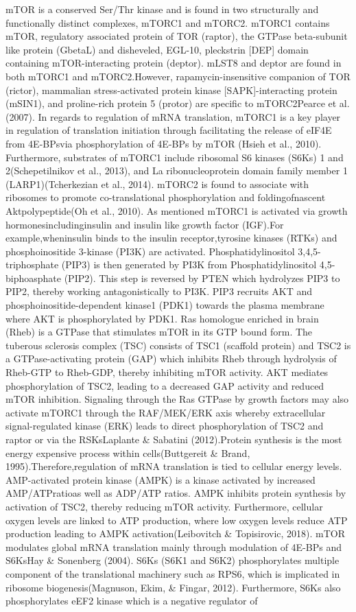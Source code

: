 \documentclass[
  12pt,
  openany]{book}
\begin{document}
mTOR is a conserved Ser/Thr kinase and is found in two structurally and functionally distinct complexes, mTORC1 and mTORC2. mTORC1 contains mTOR, regulatory associated protein of TOR (raptor), the GTPase beta-subunit like protein (GbetaL) and disheveled, EGL-10, pleckstrin {[}DEP{]} domain containing mTOR-interacting protein (deptor). mLST8 and deptor are found in both mTORC1 and mTORC2.However, rapamycin-insensitive companion of TOR (rictor), mammalian stress-activated protein kinase {[}SAPK{]}-interacting protein (mSIN1), and proline-rich protein 5 (protor) are specific to mTORC2Pearce et al. (2007). In regards to regulation of mRNA translation, mTORC1 is a key player in regulation of translation initiation through facilitating the release of eIF4E from 4E-BPsvia phosphorylation of 4E-BPs by mTOR (Hsieh et al., 2010). Furthermore, substrates of mTORC1 include ribosomal S6 kinases (S6Ks) 1 and 2(Schepetilnikov et al., 2013), and La ribonucleoprotein domain family member 1 (LARP1)(Tcherkezian et al., 2014). mTORC2 is found to associate with ribosomes to promote co-translational phosphorylation and foldingofnascent Aktpolypeptide(Oh et al., 2010). As mentioned mTORC1 is activated via growth hormonesincludinginsulin and insulin like growth factor (IGF).For example,wheninsulin binds to the insulin receptor,tyrosine kinases (RTKs) and phosphoinositide 3-kinase (PI3K) are activated. Phosphatidylinositol 3,4,5-triphosphate (PIP3) is then generated by PI3K from Phosphatidylinositol 4,5-biphoasphate (PIP2). This step is reversed by PTEN which hydrolyzes PIP3 to PIP2, thereby working antagonistically to PI3K. PIP3 recruits AKT and phosphoinositide-dependent kinase1 (PDK1) towards the plasma membrane where AKT is phosphorylated by PDK1. Ras homologue enriched in brain (Rheb) is a GTPase that stimulates mTOR in its GTP bound form. The tuberous sclerosis complex (TSC) consists of TSC1 (scaffold protein) and TSC2 is a GTPase-activating protein (GAP) which inhibits Rheb through hydrolysis of Rheb-GTP to Rheb-GDP, thereby inhibiting mTOR activity. AKT mediates phosphorylation of TSC2, leading to a decreased GAP activity and reduced mTOR inhibition. Signaling through the Ras GTPase by growth factors may also activate mTORC1 through the RAF/MEK/ERK axis whereby extracellular signal-regulated kinase (ERK) leads to direct phosphorylation of TSC2 and raptor or via the RSKsLaplante \& Sabatini (2012).Protein synthesis is the most energy expensive process within cells(Buttgereit \& Brand, 1995).Therefore,regulation of mRNA translation is tied to cellular energy levels. AMP-activated protein kinase (AMPK) is a kinase activated by increased AMP/ATPratioas well as ADP/ATP ratios. AMPK inhibits protein synthesis by activation of TSC2, thereby reducing mTOR activity. Furthermore, cellular oxygen levels are linked to ATP production, where low oxygen levels reduce ATP production leading to AMPK activation(Leibovitch \& Topisirovic, 2018). mTOR modulates global mRNA translation mainly through modulation of 4E-BPs and S6KsHay \& Sonenberg (2004). S6Ks (S6K1 and S6K2) phosphorylates multiple component of the translational machinery such as RPS6, which is implicated in ribosome biogenesis(Magnuson, Ekim, \& Fingar, 2012). Furthermore, S6Ks also phosphorylates eEF2 kinase which is a negative regulator of 
\end{document}
